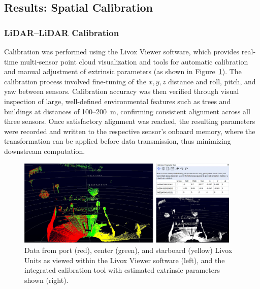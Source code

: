 \documentclass[../main.tex]{subfiles}
\begin{document}
\subsection{Results: Spatial Calibration}
\label{sec:spatial_calib_results}
\subsubsection{LiDAR–LiDAR Calibration} \label{results_lidarLidar_calib}


Calibration was performed using the Livox Viewer software, which provides real-time multi-sensor point cloud visualization and tools for automatic calibration and manual adjustment of extrinsic parameters (as shown in Figure~\ref{fig:LidarLidar_calib}). 
The calibration process involved fine-tuning of the $x, y, z$ distance and roll, pitch, and yaw between sensors.
Calibration accuracy was then verified through visual inspection of large, well-defined environmental features such as trees and buildings at distances of 100–200~m, confirming consistent alignment across all three sensors.
Once satisfactory alignment was reached, the resulting parameters were recorded and written to the respective sensor’s onboard memory, where the transformation can be applied before data transmission, thus minimizing downstream computation. 

\begin{figure}[ht]
\centering
        \includegraphics[width=0.95\textwidth]{Images/livox_viewer.png} 
\caption{Data from port (red), center (green), and starboard (yellow) Livox Units as viewed within the Livox Viewer software (left), and the integrated calibration tool with estimated extrinsic parameters shown (right). }
\label{fig:LidarLidar_calib}
\end{figure}
\end{document}
